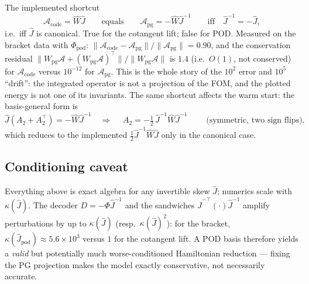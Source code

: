 The implemented shortcut
\begin{equation}
  \mathcal{A}_{\mathrm{code}} = \hat{W}\hat{J}
  \qquad\text{equals}\qquad
  \mathcal{A}_{\mathrm{pg}} = -\hat{W}\hat{J}^{-1}
  \qquad\text{iff}\quad \hat{J}^{-1} = -\hat{J},
\end{equation}
i.e.\ iff $\hat J$ is canonical. True for the cotangent lift; false for POD.
Measured on the bracket data with $\Phi_{\mathrm{pod}}$:
$\|\mathcal{A}_{\mathrm{code}} - \mathcal{A}_{\mathrm{pg}}\| /
 \|\mathcal{A}_{\mathrm{pg}}\| = 0.90$, and the conservation residual
$\|W_{\mathrm{pg}}\mathcal{A} + (W_{\mathrm{pg}}\mathcal{A})^{\top}\| /
 \|W_{\mathrm{pg}}\mathcal{A}\|$ is $1.4$ (i.e.\ $O(1)$, not conserved) for
$\mathcal{A}_{\mathrm{code}}$ versus $10^{-12}$ for
$\mathcal{A}_{\mathrm{pg}}$. This is the whole story of the $10^{2}$ error
and $10^{5}$ ``drift'': the integrated operator is not a projection of the
FOM, and the plotted energy is not one of its invariants. The same shortcut
affects the warm start: the basis-general form is
\begin{equation}
  \hat{J}(A_2 + A_2^{\top}) = -\hat{W}\hat{J}^{-1}
  \quad\Longrightarrow\quad
  \boxed{\;A_2 = -\tfrac12\,\hat{J}^{-1}\hat{W}\hat{J}^{-1}\;}
  \qquad\text{(symmetric, two sign flips)} ,
\end{equation}
which reduces to the implemented $\tfrac12 \hat{J}^{-1}\hat{W}\hat{J}$ only
in the canonical case.

\subsection{Conditioning caveat}

Everything above is exact algebra for any invertible skew $\hat J$; numerics
scale with $\kappa(\hat J)$. The decoder $D = -\Phi\hat{J}^{-1}$ and the
sandwiches $\hat{J}^{-\top}(\cdot)\hat{J}^{-1}$ amplify perturbations by up to
$\kappa(\hat J)$ (resp.\ $\kappa(\hat J)^2$): for the bracket,
$\kappa(\hat J_{\mathrm{pod}}) \approx 5.6\times 10^{3}$ versus $1$ for the
cotangent lift. A POD basis therefore yields a \emph{valid} but potentially
much worse-conditioned Hamiltonian reduction --- fixing the PG projection
makes the model exactly conservative, not necessarily accurate.
